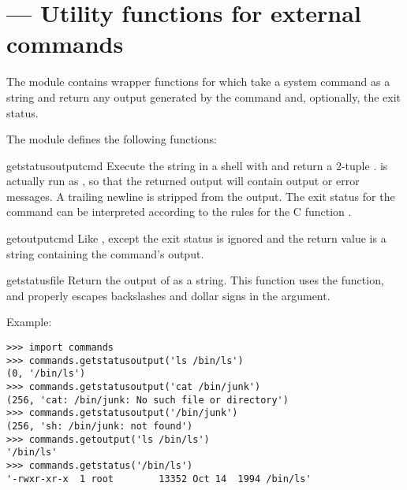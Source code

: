 \section{ ---
         Utility functions for external commands}



The  module contains wrapper functions for
 which take a system command as a string and
return any output generated by the command and, optionally, the exit
status.

The  module defines the following functions:


\begin{funcdesc}{getstatusoutput}{cmd}
Execute the string  in a shell with  and
return a 2-tuple .   is
actually run as , so that the returned
output will contain output or error messages. A trailing newline is
stripped from the output. The exit status for the command can be
interpreted according to the rules for the C function
.
\end{funcdesc}

\begin{funcdesc}{getoutput}{cmd}
Like , except the exit status is ignored
and the return value is a string containing the command's output.  
\end{funcdesc}

\begin{funcdesc}{getstatus}{file}
Return the output of  as a string.  This
function uses the  function, and properly
escapes backslashes and dollar signs in the argument.
\end{funcdesc}

Example:

\begin{verbatim}
>>> import commands
>>> commands.getstatusoutput('ls /bin/ls')
(0, '/bin/ls')
>>> commands.getstatusoutput('cat /bin/junk')
(256, 'cat: /bin/junk: No such file or directory')
>>> commands.getstatusoutput('/bin/junk')
(256, 'sh: /bin/junk: not found')
>>> commands.getoutput('ls /bin/ls')
'/bin/ls'
>>> commands.getstatus('/bin/ls')
'-rwxr-xr-x  1 root        13352 Oct 14  1994 /bin/ls'
\end{verbatim}

